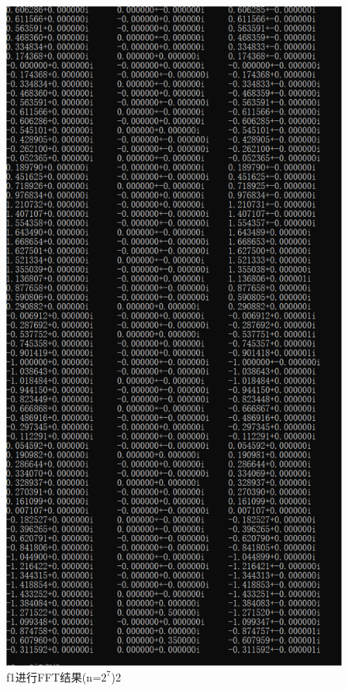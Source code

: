 \documentclass{article}
\begin{document}
\begin{figure}[!h]
	
	\centering
	\includegraphics[scale=0.4]{f1_7(2)}
	\caption{\heiti{}f1进行FFT结果(n=$ 2^7 $)2}
	
\end{figure}
\end{document}
